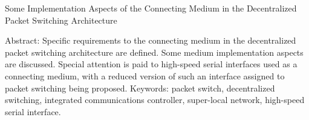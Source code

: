 Some Implementation Aspects of the Connecting Medium in 
the Decentralized Packet Switching Architecture

Abstract: Specific requirements to the connecting medium in the decentralized packet 
switching architecture are defined. Some medium implementation aspects are discussed. 
Special attention is paid to high-speed serial interfaces used as a connecting medium, with a 
reduced version of such an interface assigned to packet switching being proposed.
Keywords: packet switch, decentralized switching, integrated communications controller, 
super-local network, high-speed serial interface.